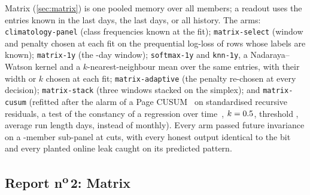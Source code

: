 \documentclass[11pt]{article}
\newcommand{\code}[1]{\texttt{#1}}
\begin{document}
Matrix (\cref{sec:matrix}) is one pooled memory over all members; a readout uses the entries known
in the last \NumWinShort{} days, the last \NumWinYear{} days, or all history. The arms:
\code{climatology-panel} (class frequencies known at the fit); \code{matrix-select} (window and
penalty chosen at each fit on the prequential log-loss of rows whose labels are known); \code{matrix-1y}
(the \NumWinYear-day window); \code{softmax-1y} and \code{knn-1y}, a Nadaraya--Watson kernel and a
$k$-nearest-neighbour mean over the same entries, with their width or $k$ chosen at each fit;
\code{matrix-adaptive} (the penalty re-chosen at every decision); \code{matrix-stack} (three windows
stacked on the simplex); and \code{matrix-cusum} (refitted after the alarm of a Page CUSUM~\cite{page1954} %
on standardised recursive residuals, a test of the constancy of a regression over
time~\cite{brown1975}, %
 $k=0.5$, threshold \NumCusumH, average run length
\NumCusumARL{} days, instead of monthly). Every arm passed future invariance on a
\NumHonePanelMembers-member sub-panel at \NumHonePanelCuts{} cuts, with every honest output
identical to the bit and every planted online leak caught on its predicted pattern.

\subsection{\texorpdfstring{Report n\textsuperscript{o}\,2: Matrix}{Report 2: Matrix}}
\end{document}
